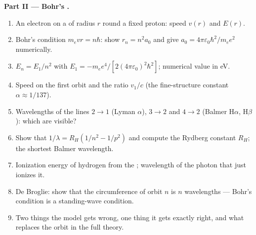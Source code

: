 \begin{problem}
\medskip
\noindent\textbf{Part II --- Bohr's .}
\begin{enumerate}[resume]
  \item An electron on a  of radius $r$ round a fixed
        proton: speed $v(r)$ and  $E(r)$.
  \item Bohr's condition $m_evr = n\hbar$: show $r_n = n^2a_0$ and give
        $a_0 = 4\pi\varepsilon_0\hbar^2/m_ee^2$ numerically.
  \item $E_n = E_1/n^2$ with $E_1 = -m_ee^4/[2(4\pi\varepsilon_0)^2\hbar^2]$;
        numerical value in eV.
  \item Speed on the first orbit and the ratio $v_1/c$ (the
        fine-structure constant $\alpha \approx 1/137$).
  \item Wavelengths of the lines $2 \to 1$ (Lyman $\alpha$), $3 \to 2$ and
        $4 \to 2$ (Balmer H$\alpha$, H$\beta$): which are visible?
  \item Show that $1/\lambda = R_H(1/n^2 - 1/p^2)$ and compute the Rydberg
        constant $R_H$; the shortest Balmer wavelength.
  \item Ionization energy of hydrogen from the ; wavelength
        of the photon that just ionizes it.
  \item De Broglie: show that the circumference of orbit $n$ is $n$
        wavelengths --- Bohr's condition is a standing-wave condition.
  \item Two things the model gets wrong, one thing it gets exactly
        right, and what replaces the orbit in the full theory.
\end{enumerate}


\end{problem}
